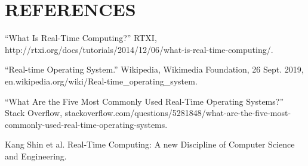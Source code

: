 \documentclass[letterpaper, 10 pt]{IEEEconf}
\begin{document}
\section*{REFERENCES}


\begin{enumerate}[label={[\arabic*]}]
  \item “What Is Real-Time Computing?” RTXI, http://rtxi.org/docs/tutorials/2014/12/06/what-is-real-time-computing/.
  \item ``Real-time Operating System.'' Wikipedia, Wikimedia Foundation, 26 Sept. 2019, \\ en.wikipedia.org/wiki/Real-time\_operating\_system.
  \item “What Are the Five Most Commonly Used Real-Time Operating Systems?” Stack Overflow, stackoverflow.com/questions/5281848/what-are-the-five-most-commonly-used-real-time-operating-systems. 
  \item Kang Shin et al. Real-Time Computing: A new Discipline of Computer Science and Engineering.
\end{enumerate}
\end{document}
